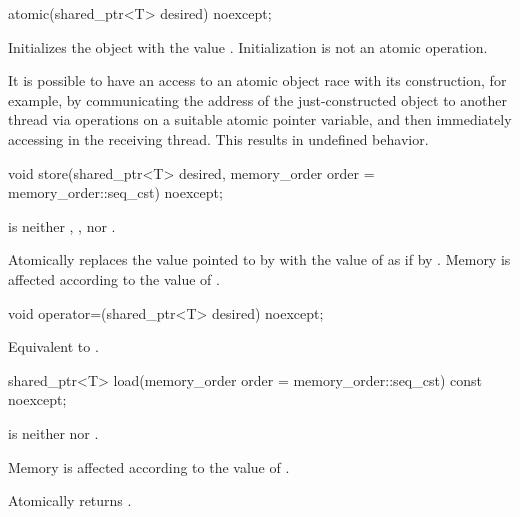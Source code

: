 %
\begin{itemdecl}
atomic(shared_ptr<T> desired) noexcept;
\end{itemdecl}

\begin{itemdescr}
\pnum
\effects
Initializes the object with the value .
Initialization is not an atomic operation.
\begin{note}
It is possible to have an access to
an atomic object  race with its construction,
for example,
by communicating the address of the just-constructed object 
to another thread via  operations
on a suitable atomic pointer variable, and
then immediately accessing  in the receiving thread.
This results in undefined behavior.
\end{note}
\end{itemdescr}

%
\begin{itemdecl}
void store(shared_ptr<T> desired, memory_order order = memory_order::seq_cst) noexcept;
\end{itemdecl}

\begin{itemdescr}
\pnum
\expects
{} is neither
,
, nor
.

\pnum
\effects
Atomically replaces the value pointed to by  with
the value of  as if by .
Memory is affected according to the value of .
\end{itemdescr}

%
\begin{itemdecl}
void operator=(shared_ptr<T> desired) noexcept;
\end{itemdecl}

\begin{itemdescr}
\pnum
\effects
Equivalent to .
\end{itemdescr}

%
\begin{itemdecl}
shared_ptr<T> load(memory_order order = memory_order::seq_cst) const noexcept;
\end{itemdecl}

\begin{itemdescr}
\pnum
\expects
{} is neither
 nor .

\pnum
\effects
Memory is affected according to the value of .

\pnum
\returns
Atomically returns .
\end{itemdescr}

